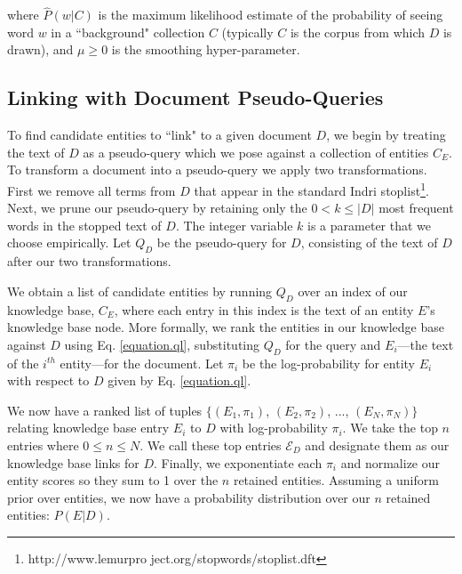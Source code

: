 \documentclass{sig-alternate}
\newcommand\rankeq{\mathrel{\overset{\makebox[0pt]{\mbox{\normalfont\tiny\sffamily rank}}}{=}}}
\begin{document}
\noindent where $\hat{P}(w | C)$ is the maximum likelihood estimate of the probability of seeing word $w$ in a ``background" collection $C$ (typically $C$ is the corpus from which $D$ is drawn), and $\mu \geq 0$ is the smoothing hyper-parameter. 


\subsection{Linking with Document Pseudo-Queries}\label{section.linking.queries}
%
%
To find candidate entities to ``link" to a given document $D$, we begin by treating the text of $D$ as a pseudo-query which we pose against a collection of entities $C_E$.  To transform a document into a pseudo-query we apply two transformations.  First we remove all terms from $D$ that appear in the standard Indri stoplist\footnote{http://www.lemurpro ject.org/stopwords/stoplist.dft}.  Next, we prune our pseudo-query by retaining only the $0 < k \leq |D|$ most frequent words in the stopped text of $D$.  The integer variable $k$ is a parameter that we choose empirically.  Let $Q_D$ be the pseudo-query for $D$, consisting of the text of $D$ after our two transformations.

We obtain a list of candidate entities by running $Q_D$ over an index of our knowledge base, $C_E$, where each entry in this index is the text of an entity $E$'s knowledge base node. More formally, we rank the entities in our knowledge base against $D$ using Eq. \ref{equation.ql}, substituting $Q_D$ for the query and $E_i$---the text of the $i^{th}$ entity---for the document. Let $\pi_i$ be the log-probability for entity $E_i$ with respect to $D$ given by Eq. \ref{equation.ql}.  

We now have a ranked list of tuples $\{(E_1, \pi_1)$, $(E_2, \pi_2)$, $...$, $(E_N, \pi_N)\}$ relating knowledge base entry $E_i$ to $D$ with log-probability $\pi_i$. We take the top $n$ entries where $0 \leq n \leq N$. We call these top entries $\mathcal{E}_D$ and designate them as our knowledge base links for $D$.  Finally, we exponentiate each $\pi_i$ and normalize our entity scores so they sum to 1 over the $n$ retained entities.  Assuming a uniform prior over entities, we now have a probability distribution over our $n$ retained entities: $P(E | D)$.
\end{document}
